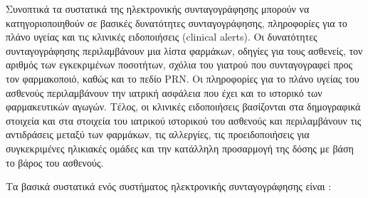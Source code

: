 		Συνοπτικά τα συστατικά της ηλεκτρονικής συνταγογράφησης μπορούν να κατηγοριοποιηθούν σε βασικές δυνατότητες συνταγογράφησης, πληροφορίες για το πλάνο υγείας και τις κλινικές ειδοποιήσεις (clinical alerts).  Οι δυνατότητες συνταγογράφησης περιλαμβάνουν μια λίστα φαρμάκων, οδηγίες για τους ασθενείς, τον αριθμός των εγκεκριμένων ποσοτήτων, σχόλια του γιατρού που συνταγογραφεί προς τον φαρμακοποιό, καθώς και το πεδίο PRN. Οι πληροφορίες για το πλάνο υγείας του ασθενούς περιλαμβάνουν την ιατρική ασφάλεια που έχει και το ιστορικό των φαρμακευτικών αγωγών. Τέλος, οι κλινικές ειδοποιήσεις  βασίζονται στα δημογραφικά στοιχεία και στα στοιχεία του ιατρικού ιστορικού του ασθενούς και περιλαμβάνουν τις αντιδράσεις μεταξύ των φαρμάκων, τις αλλεργίες, τις προειδοποιήσεις για συγκεκριμένες ηλικιακές ομάδες και την κατάλληλη προσαρμογή της δόσης με βάση το βάρος του ασθενούς. \cite{prescribing} 
		
		
		Τα βασικά συστατικά ενός συστήματος ηλεκτρονικής συνταγογράφησης είναι \cite{Grossman2012}:

